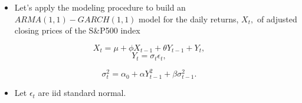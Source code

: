 \documentclass[]{book}
\newenvironment{Shaded}{\begin{snugshade}}{\end{snugshade}}
\newcommand{\DataTypeTok}[1]{\textcolor[rgb]{0.13,0.29,0.53}{#1}}
\newcommand{\DecValTok}[1]{\textcolor[rgb]{0.00,0.00,0.81}{#1}}
\newcommand{\KeywordTok}[1]{\textcolor[rgb]{0.13,0.29,0.53}{\textbf{#1}}}
\newcommand{\NormalTok}[1]{#1}
\newcommand{\OperatorTok}[1]{\textcolor[rgb]{0.81,0.36,0.00}{\textbf{#1}}}
\newcommand{\StringTok}[1]{\textcolor[rgb]{0.31,0.60,0.02}{#1}}
\providecommand{\tightlist}{%
  \setlength{\itemsep}{0pt}\setlength{\parskip}{0pt}}
\begin{document}
\begin{itemize}
\tightlist
\item
  Let's apply the modeling procedure to build an \(ARMA(1,1)-GARCH(1,1)\) model for the daily returns, \(X_t,\) of adjusted closing prices of the S\&P500 index
\end{itemize}

\[X_t = \mu + \phi X_{t-1}+\theta Y_{t-1} + Y_t,\]
\[Y_t= \sigma_t\epsilon_t,\]

\[\sigma_t^2=\alpha_0+\alpha Y_{t-1}^2+\beta\sigma_{t-1}^2.\]

\begin{itemize}
\tightlist
\item
  Let \(\epsilon_t\) are iid standard normal.
\end{itemize}

\begin{Shaded}
\end{Shaded}
\end{document}
